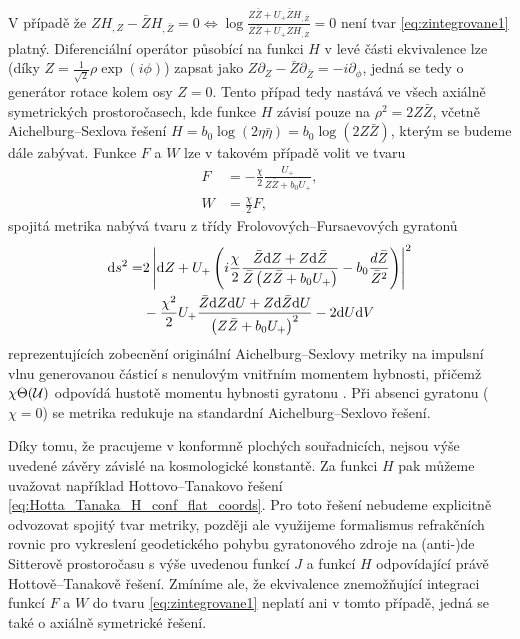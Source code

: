 V případě že $Z H_{,Z} - \bar{Z}H_{,\bar{Z}}=0 \iff \log \frac{Z \bar{Z} + U_{+}\bar{Z}H_{,\bar{Z}}}{Z\bar{Z}+U_{+}ZH_{,Z}}=0$
není tvar \eqref{eq:zintegrovane1} platný. Diferenciální operátor působící na funkci $H$ v levé části ekvivalence
lze (díky $Z = \frac{1}{\sqrt{2}} \rho \exp(i \phi)$) zapsat jako $Z \partial_Z - \bar{Z}\partial_{\bar{Z}} = - i \partial_\phi$,
jedná se tedy o generátor rotace kolem osy $Z = 0$. Tento případ tedy nastává ve všech axiálně symetrických prostoročasech, kde
funkce $H$ závisí pouze na $\rho^2 = 2 Z \bar{Z}$, včetně Aichelburg--Sexlova řešení
$H = b_0 \log(2\eta \bar{\eta}) = b_0 \log (2Z \bar{Z})$, kterým se budeme dále zabývat.
Funkce $F$ a $W$ lze v takovém případě volit ve tvaru
\begin{equation}
    \label{eq:zintegrovane2}
    \begin{split}
        F &= -\frac{\chi}{2} \frac{U_{+}}{Z \bar{Z} + b_0 U_{+}}, \\
        W &= \frac{\chi}{2}F,
    \end{split}
\end{equation}
spojitá metrika nabývá tvaru z třídy Frolovových--Fursaevových gyratonů \cite{Frolov2005} 
\begin{equation}
    \begin{split}
    \mathrm{d} s^2 = &2 \left| \mathrm{d} Z + U_{+} \left(i \frac{\chi}{2}\frac{\bar{Z}\mathrm{d} Z + Z \mathrm{d} \bar{Z}}{\bar{Z}\left(Z \bar{Z} + b_0 U_{+}\right)} - b_0 \frac{d\bar{Z}}{\bar{Z}^2}\right) \right|^2 \\
    &- \frac{\chi^2}{2}U_{+}\frac{\bar{Z} \mathrm{d} Z \mathrm{d} U + Z \mathrm{d} \bar{Z} \mathrm{d} U}{\left(Z \bar{Z} + b_0 U_{+}\right)^2} - 2 \mathrm{d} U \mathrm{d} V
    \end{split}
\end{equation}
reprezentujících zobecnění
originální Aichelburg--Sexlovy metriky \cite{Aichelburg_1971} na impulsní vlnu generovanou částicí s
nenulovým vnitřním momentem hybnosti, přičemž $\chi \Theta(\mathcal{U})$ odpovídá hustotě momentu hybnosti gyratonu \cite{Podolsky2014}.
Při absenci gyratonu ($\chi=0$) se metrika redukuje na standardní Aichelburg--Sexlovo řešení.

Díky tomu, že pracujeme v konformně plochých souřadnicích, nejsou výše uvedené závěry závislé na kosmologické konstantě.
Za funkci $H$ pak můžeme uvažovat například Hottovo--Tanakovo řešení \eqref{eq:Hotta_Tanaka_H_conf_flat_coords}. Pro toto řešení nebudeme explicitně odvozovat
spojitý tvar metriky, později ale využijeme formalismus refrakčních rovnic pro vykreslení geodetického pohybu gyratonového zdroje na (anti-)de Sitterově prostoročasu
s výše uvedenou funkcí $J$ a funkcí $H$ odpovídající právě Hottově--Tanakově řešení. Zmíníme ale, že ekvivalence znemožňující integraci funkcí $F$ a $W$ do tvaru
\eqref{eq:zintegrovane1} neplatí ani v tomto případě, jedná se také o axiálně symetrické řešení.


